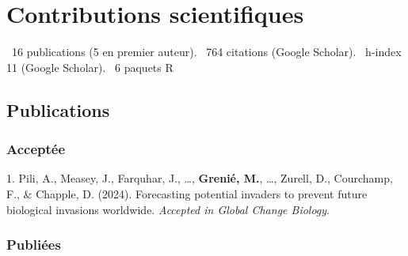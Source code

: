 \documentclass[12pt,a4paper,]{article}
\newlength{\cslhangindent}
\newenvironment{CSLReferences}[2] %
 {\begin{list}{}{%
  \setlength{\itemindent}{0pt}
  \setlength{\leftmargin}{0pt}
  \setlength{\parsep}{0pt}
  \ifodd #1
   \setlength{\leftmargin}{\cslhangindent}
   \setlength{\itemindent}{-1\cslhangindent}
  \fi
  \setlength{\itemsep}{#2\baselineskip}}}
 {\end{list}}
\begin{document}
\section{Contributions scientifiques}\label{contributions-scientifiques}

\faFile*~16 publications (5 en premier auteur). \faQuoteLeft~764
citations (Google Scholar). \faHSquare~h-index 11 (Google Scholar).
\faRProject~6 paquets R

\subsection{Publications}\label{publications}

\subsubsection{Acceptée}\label{acceptuxe9e}

\label{refs-b7e7f3d247ef10bbb35423e631999e1e}
\begin{CSLReferences}{1}{1}
1. Pili, A., Measey, J., Farquhar, J., \ldots, \textbf{Grenié, M.},
\ldots, Zurell, D., Courchamp, F., \& Chapple, D. (2024). Forecasting
potential invaders to prevent future biological invasions worldwide.
\emph{Accepted in Global Change Biology}.

\end{CSLReferences}

\subsubsection{Publiées}\label{publiuxe9es}
\end{document}

